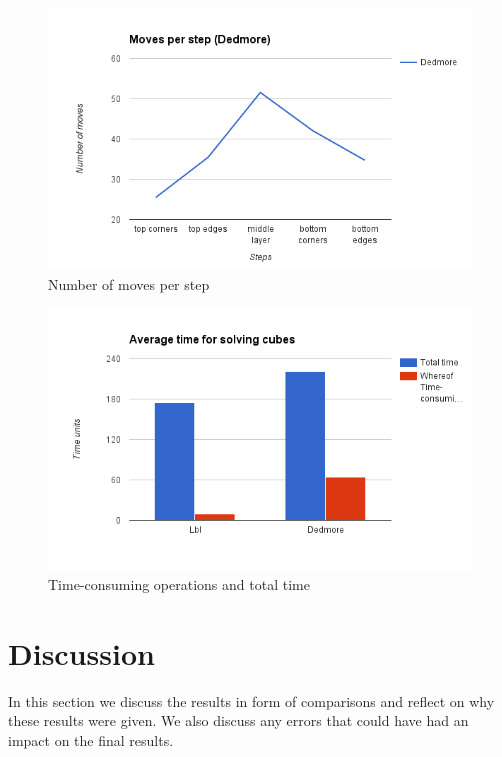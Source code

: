 \documentclass[a4paper,11pt]{kth-mag}
\begin{document}
\begin{figure}[ht!]
	\centering
	\includegraphics[width= 1.0\textwidth]{figs/dedmoresteps.png}
	\caption{Number of moves per step}
	\label{fig_22}
\end{figure}
\begin{figure}[ht!]
	\centering
	\includegraphics[width= 1.0\textwidth]{figs/time.png}
	\caption{Time-consuming operations and total time}
	\label{fig_23}
\end{figure}
\chapter{Discussion}
In this section we discuss the results in form of comparisons and reflect on why these results were given. We also discuss any errors that could have had an impact on the final results.
\end{document}
